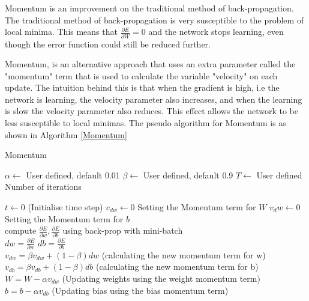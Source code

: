  \label{SMOM}
Momentum is an improvement on the traditional method of back-propagation. The traditional method of back-propagation is very susceptible to the problem of local minima. This means that $\frac{\partial E}{\partial W} = 0$ and the network stops learning, even though the error function could still be reduced further. 

Momentum, is an alternative approach that uses an extra parameter called the "momentum" term that is used to calculate the variable "velocity" on each update. The intuition behind this is that when the gradient is high, i.e the network is learning, the velocity parameter also increases, and when the learning is slow the velocity parameter also reduces. This effect allows the network to be less susceptible to local minimas. The pseudo algorithm for Momentum is as shown in Algorithm \ref{Momentum}

\begin{algorithm}[H]
\caption{Momentum}\label{Momentum}
\begin{algorithmic}[1]
\State $\alpha \gets$ User defined, default 0.01
\State $\beta \gets$ User defined, default 0.9
\State $T \gets$ User defined Number of iterations

\State $t \gets 0$ (Initialise time step)
\State $v_{dw} \gets 0$ Setting the Momentum term for $W$
\State $v_dw \gets 0$ Setting the Momentum term for $b$
\\
\State compute $\frac{\partial E}{\partial w}, \frac{\partial E}{\partial b}$ using back-prop with mini-batch
\\
\State $dw = \frac{\partial E}{\partial w}$
\State $db = \frac{\partial E}{\partial b}$
\\
\State $v_{dw} = \beta v_{dw}  + (1-\beta)dw$ (calculating the new momentum term for w)
\State $v_{db} = \beta v_{db}  + (1-\beta)db$ (calculating the new momentum term for b)
\\
\State $W = W-\alpha v_{dw}$ (Updating weights using the weight momentum term)
\State $b = b-\alpha v_{db}$ (Updating bias using the bias momentum term)
\EndFor
\EndFor
\end{algorithmic}
\end{algorithm}